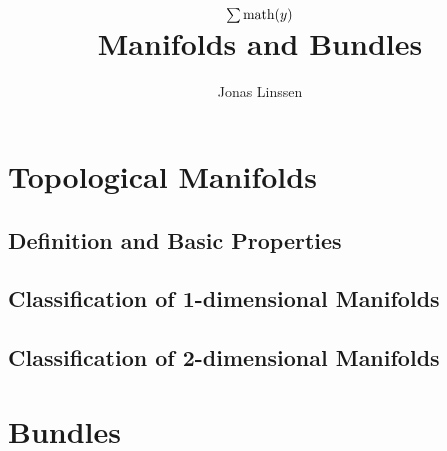 

\title{
	$\sum \text{math}(y)$\\
	Manifolds and Bundles
}
\author{Jonas Linssen}


	\maketitle
	\tableofcontents

	\newpage
	\section{Topological Manifolds}
	\subsection{Definition and Basic Properties}

	\begin{proposition}

	\end{proposition}
	\subsection{Classification of 1-dimensional Manifolds}
	\subsection{Classification of 2-dimensional Manifolds}

	\newpage
	\section{Bundles}
